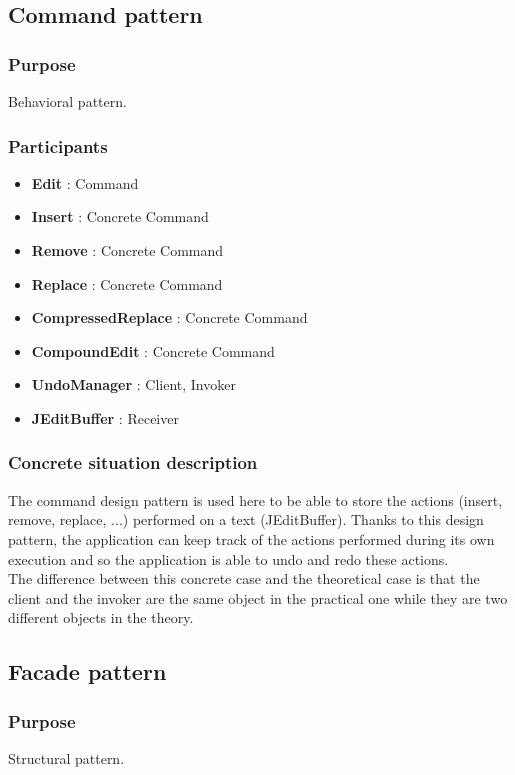 \documentclass[a4paper,10pt]{article}
\begin{document}
\subsection{Command pattern}
\subsubsection{Purpose}
Behavioral pattern.
\subsubsection[Participants]{Participants\footnotemark[1]}
\begin{itemize}
 \item \textbf{Edit} : Command
 \item \textbf{Insert} : Concrete Command
 \item \textbf{Remove} : Concrete Command
 \item \textbf{Replace} : Concrete Command
 \item \textbf{CompressedReplace} : Concrete Command
 \item \textbf{CompoundEdit} : Concrete Command
 \item \textbf{UndoManager} : Client, Invoker
 \item \textbf{JEditBuffer} : Receiver
\end{itemize}

\subsubsection{Concrete situation description}
The command design pattern is used here to be able to store the actions (insert, remove, replace, ...) performed on a text (JEditBuffer). Thanks to this design pattern, the application can keep track of the actions performed during its own execution and so the application is able to undo and redo these actions. \\
The difference between this concrete case and the theoretical case is that the client and the invoker are the same object in the practical one while they are two different objects in the theory.

\subsection{Facade pattern}
\subsubsection{Purpose}
Structural pattern.
\end{document}
